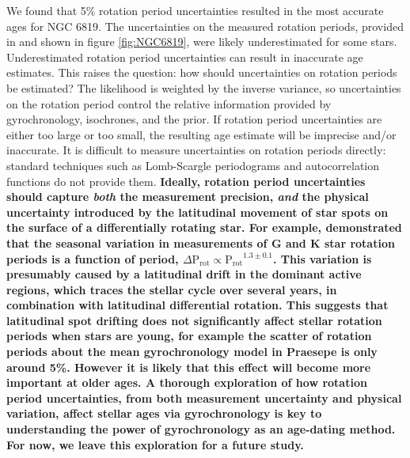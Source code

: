 \documentclass[useAMS, usenatbib, preprint, 12pt]{aastex}
\newcommand{\racomment}[1]{{\bf #1}}
\begin{document}
We found that 5\% rotation period uncertainties resulted in the most accurate
ages for NGC 6819.
The uncertainties on the measured rotation periods, provided in
\citet{meibom2015} and shown in figure \ref{fig:NGC6819}, were likely
underestimated for some stars.
Underestimated rotation period uncertainties can result in inaccurate age
estimates.
This raises the question: how should uncertainties on rotation periods be
estimated?
The likelihood is weighted by the inverse variance, so uncertainties on the
rotation period control the relative information provided by gyrochronology,
isochrones, and the prior.
If rotation period uncertainties are either too large or too small, the
resulting age estimate will be imprecise and/or inaccurate.
It is difficult to measure uncertainties on rotation periods directly:
standard techniques such as Lomb-Scargle periodograms and autocorrelation
functions do not provide them.
\racomment{Ideally, rotation period uncertainties should capture {\it both} the
measurement precision, {\it and} the physical uncertainty introduced by the
latitudinal movement of star spots on the surface of a differentially rotating
star.
For example, \citet{donahue1996} demonstrated that the seasonal variation in
measurements of G and K star rotation periods is a function of period, $\Delta
\mathrm{P_{rot}} \propto \mathrm{P_{rot}}^{1.3\pm0.1}$.
This variation is presumably caused by a latitudinal drift in the dominant
active regions, which traces the stellar cycle over several years, in
combination with latitudinal differential rotation.
This suggests that latitudinal spot drifting does not significantly
affect stellar rotation periods when stars are young, for example the scatter
of rotation periods about the mean gyrochronology model in Praesepe is only
around 5\%.
However it is likely that this effect will become more important at older
ages.
A thorough exploration of how rotation period uncertainties, from both
measurement uncertainty and physical variation, affect stellar ages via
gyrochronology is key to understanding the power of gyrochronology as an
age-dating method.
For now, we leave this exploration for a future study.}
\end{document}
